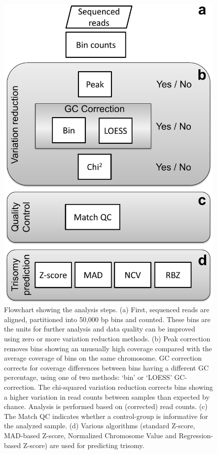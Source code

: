 \begin{figure}
	\includegraphics[width=0.6\linewidth]{img/Algorithms_NIPT_Fig1}
	\caption[Flowchart NIPT analysis steps]{Flowchart showing the analysis steps. (a) First, sequenced reads are aligned, partitioned into 50,000 bp bins and counted. These bins are the units for further analysis and data quality can be improved using zero or more variation reduction methods. (b) Peak correction removes bins showing an unusually high coverage compared with the average coverage of bins on the same chromosome. GC correction corrects for coverage differences between bins having a different GC percentage, using one of two methods: ‘bin’ or ‘LOESS’ GC-correction. The chi-squared variation reduction corrects bins showing a higher variation in read counts between samples than expected by chance. Analysis is performed based on (corrected) read counts. (c) The Match QC indicates whether a control-group is informative for the analyzed sample. (d) Various algorithms (standard Z-score, MAD-based Z-score, Normalized Chromosome Value and Regression-based Z-score) are used for predicting trisomy.}
	\label{fig:Algorithms_NIPT_Fig1}
\end{figure}

